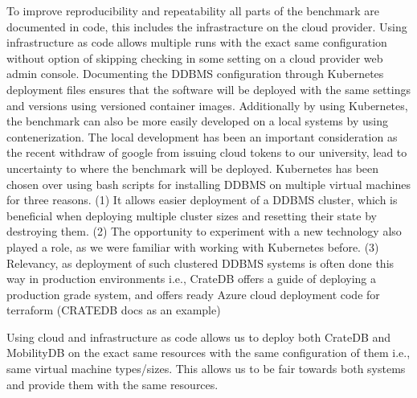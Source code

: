 To improve reproducibility and repeatability all parts of the benchmark are documented in code, this includes the infrastracture on the cloud provider.
Using infrastructure as code allows multiple runs with the exact same configuration without option of skipping checking in some setting on a cloud provider web admin console.
Documenting the DDBMS configuration through Kubernetes deployment files ensures that the software will be deployed with the same settings and versions using versioned container images.
Additionally by using Kubernetes, the benchmark can also be more easily developed on a local systems by using contenerization.
The local development has been an important consideration as the recent withdraw of google from issuing cloud tokens to our university, lead to uncertainty to where the benchmark will be deployed.
Kubernetes has been chosen over using bash scripts for installing DDBMS on multiple virtual machines for three reasons.
(1) It allows easier deployment of a DDBMS cluster, which is beneficial when deploying multiple cluster sizes and resetting their state by destroying them.
(2) The opportunity to experiment with a new technology also played a role, as we were familiar with working with Kubernetes before.
(3) Relevancy, as deployment of such clustered DDBMS systems is often done this way in production environments i.e., CrateDB offers a guide of deploying a production grade system, and offers ready Azure cloud deployment code for terraform (CRATEDB docs as an example)

Using cloud and infrastructure as code allows us to deploy both CrateDB and MobilityDB on the exact same resources with the same configuration of them i.e., same virtual machine types/sizes.
This allows us to be fair towards both systems and provide them with the same resources.

